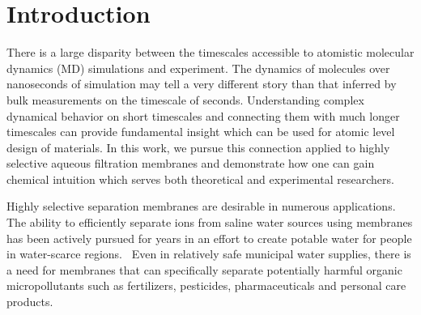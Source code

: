 \documentclass[journal=jctcce,manuscript=article]{achemso}
\begin{document}
  \maketitle
  
  \graphicspath{{./figures/}}

  \section{Introduction}

  There is a large disparity between the timescales accessible to atomistic 
  molecular dynamics (MD) simulations and experiment. The dynamics of molecules 
  over nanoseconds of simulation may tell a very different story than that 
  inferred by bulk measurements on the timescale of seconds. Understanding 
  complex dynamical behavior on short timescales and connecting them with much
  longer timescales can provide fundamental insight which can be used for 
  atomic level design of materials. In this work, we pursue this connection 
  applied to highly selective aqueous filtration membranes and demonstrate how
  one can gain chemical intuition which serves both theoretical and experimental
  researchers.

  Highly selective separation membranes are desirable in numerous
  applications. The ability to efficiently separate ions from saline water
  sources using membranes has been actively pursued for years in an effort to
  create potable water for people in water-scarce
  regions.~\cite{werber_materials_2016} Even in relatively safe municipal water
  supplies, there is a need for membranes that can specifically separate
  potentially harmful organic micropollutants such as fertilizers, pesticides,
  pharmaceuticals and personal care products.~\cite{barbosa_occurrence_2016} 
\end{document}
